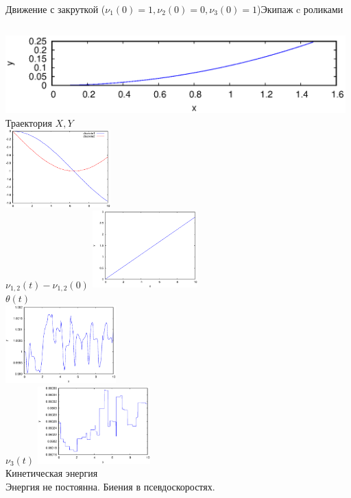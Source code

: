 \documentclass{beamer}
\begin{document}
\begin{frame}{Движение с закруткой ($\nu_1(0) = 1, \nu_2(0) = 0, \nu_3(0) = 1$)}{Экипаж c роликами}
    \begin{columns}
            \centering
            \includegraphics[width=\linewidth, height=30mm]{_sol__1_0_1__0__10__1e2_trajectory} \\
            Траектория $X, Y$ \\
            \includegraphics[width=\linewidth, height=30mm]{_sol__1_0_1__0__10__1e2_nu12_centered} \\
            $\nu_{1,2}(t) - \nu_{1,2}(0)$
            \centering
            \includegraphics[width=\linewidth, height=30mm]{_sol__1_0_1__0__10__1e2_theta} \\
            $\theta(t)$ \\
            \includegraphics[width=\linewidth, height=30mm]{_sol__1_0_1__0__10__1e2_nu3} \\
            $\nu_3(t)$
            \centering
            \includegraphics[width=\linewidth, height=30mm]{_sol__1_0_1__0__10__1e2_kin_en} \\
            Кинетическая энергия \\
            \vspace{15pt}
            Энергия не постоянна. Биения в псевдоскоростях.
    \end{columns}
\end{frame}
\end{document}
